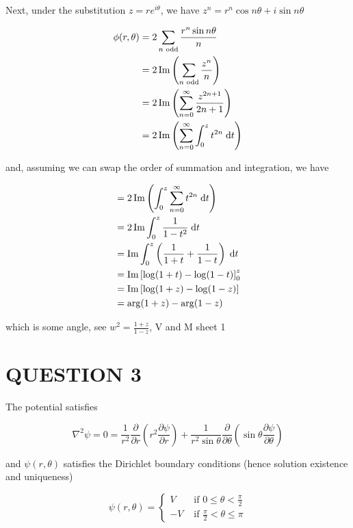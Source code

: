 \documentclass[a4paper]{article}
\begin{document}
Next, under the substitution $ z = r e^{i \theta} $, we have $ z^{n} = r^{n} \cos n \theta + i \sin n \theta $

\begin{align*}
\phi(r,\theta) & = 2 \sum_{n \text{ odd}}  \frac{ r^{n} \sin n \theta }{n} \\
& = 2 \operatorname{Im} \left( \sum_{n \text{ odd}} \frac{z^{n}}{n}  \right) \\
& = 2 \operatorname{Im} \left( \sum_{n = 0}^{\infty} \frac{z^{2n + 1}}{2n + 1}  \right) \\
& = 2 \operatorname{Im} \left( \sum_{n= 0}^{\infty} \int_{0}^{z} t^{2n} \; \mathrm{d} t \right) 
\end{align*}

and, assuming we can swap the order of summation and integration, we have 

\begin{align*}
& = 2 \operatorname{Im} \left( \int_{0}^{z} \sum_{n= 0}^{\infty} t^{2n} \; \mathrm{d} t \right) \\
& = 2 \operatorname{Im} \int_{0}^{z} \frac{1}{1-t^{2}} \; \mathrm{d} t \\
& = \operatorname{Im} \int_{0}^{z} \left(   \frac{1}{1+t} + \frac{1}{1-t}  \right)  \; \mathrm{d} t \\
& = \operatorname{Im} \left[  \log(1+t) - \log(1-t) \right]_{0}^{z} \\
& = \operatorname{Im} \left[  \log(1+z) - \log(1-z) \right] \\
& = \arg(1 + z) - \arg(1-z)
\end{align*}

which is some angle, see $ w^{2} = \frac{1+z}{1-z} $, V and M sheet 1










\section{QUESTION 3}


The potential satisfies

\[ \nabla^{2} \psi = 0 = \frac{1}{r^{2}} \frac{\partial }{\partial r} \left( r^{2}  \frac{\partial \psi }{\partial r} \right) + \frac{1}{r^{2} \sin \theta} \frac{\partial}{\partial \theta} \left(  \sin \theta \frac{\partial \psi }{\partial \theta} \right)     \]

and $ \psi(r,\theta) $ satisfies the Dirichlet boundary conditions (hence solution existence and uniqueness)

\[ \psi(r,\theta) = \begin{cases} V  & \text{ if } 0 \leq \theta < \frac{\pi}{2} \\ -V & \text{ if } \frac{\pi}{2} < \theta \leq \pi \end{cases} \]
\end{document}
